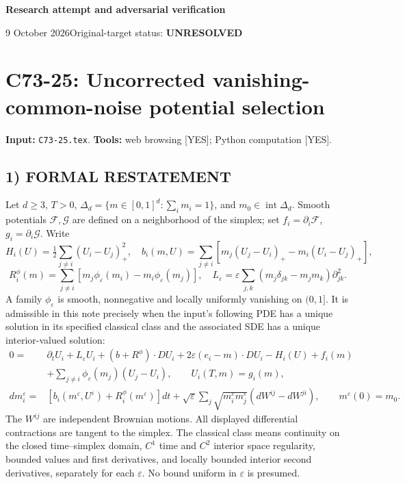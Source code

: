 \documentclass[11pt,a4paper]{article}
\theoremstyle{definition}
\theoremstyle{remark}
\begin{document}
{\large\bfseries Research attempt and adversarial verification}\par
9 October 2026\hfill Original-target status: \textbf{UNRESOLVED}\par
\section{C73-25: Uncorrected vanishing-common-noise potential selection}
\label{sec:C73-25}
\noindent\textbf{Input:} \texttt{C73-25.tex}. \quad\textbf{Tools:} web browsing [YES]; Python computation [YES].
\subsection*{1) FORMAL RESTATEMENT}
Let $d\geq3$, $T>0$, $\Delta_d=\{m\in[0,1]^d:\sum_i m_i=1\}$, and $m_0\in\operatorname{int}\Delta_d$. Smooth potentials $\mathcal F,\mathcal G$ are defined on a neighborhood of the simplex; set $f_i=\partial_i\mathcal F$, $g_i=\partial_i\mathcal G$. Write
\[
 H_i(U)=\tfrac12\sum_{j\ne i}(U_i-U_j)_+^2,
 \quad b_i(m,U)=\sum_{j\ne i}[m_j(U_j-U_i)_+-m_i(U_i-U_j)_+],
\]
\[
 R_i^\phi(m)=\sum_{j\ne i}[m_j\phi_\varepsilon(m_i)-m_i\phi_\varepsilon(m_j)],
 \quad L_\varepsilon=\varepsilon\sum_{j,k}(m_j\delta_{jk}-m_jm_k)\partial_{jk}^2.
\]
A family $\phi_\varepsilon$ is smooth, nonnegative and locally uniformly vanishing on $(0,1]$. It is admissible in this note precisely when the input's following PDE has a unique solution in its specified classical class and the associated SDE has a unique interior-valued solution:
\begin{align*}
0={}&\partial_tU_i+L_\varepsilon U_i+(b+R^\phi)\cdot DU_i
 +2\varepsilon(e_i-m)\cdot DU_i-H_i(U)+f_i(m)\\
&+\sum_{j\ne i}\phi_\varepsilon(m_j)(U_j-U_i),
 \qquad U_i(T,m)=g_i(m),\\
dm_i^\varepsilon={}&[b_i(m^\varepsilon,U^\varepsilon)+R_i^\phi(m^\varepsilon)]dt
 +\sqrt\varepsilon\sum_j\sqrt{m_i^\varepsilon m_j^\varepsilon}
       (dW^{ij}-dW^{ji}),\qquad m^\varepsilon(0)=m_0.
\end{align*}
The $W^{ij}$ are independent Brownian motions. All displayed differential contractions are tangent to the simplex. The classical class means continuity on the closed time--simplex domain, $C^1$ time and $C^2$ interior space regularity, bounded values and first derivatives, and locally bounded interior second derivatives, separately for each $\varepsilon$. No bound uniform in $\varepsilon$ is presumed.
\end{document}
